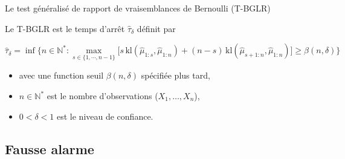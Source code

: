 \documentclass[11pt,french,ignorenonframetext,]{beamer}
\providecommand{\tightlist}{%
  \setlength{\itemsep}{0pt}\setlength{\parskip}{0pt}}
\begin{document}


\begin{frame}{Le test généralisé de rapport de vraisemblances de Bernoulli (T-BGLR)}

    Le \alert{T-BGLR} est le temps d'arrêt $\widehat{\tau}_{\delta}$ définit par
    \begin{small}
    \[ \widehat{\tau}_{\delta} = \inf \bigl\{ n \in \mathbb{N}^* : \max_{s \in \{1,\cdots,n-1\}} \bigl[s \, \mathrm{kl}\left(\widehat{\mu}_{1:s},\widehat{\mu}_{1:n}\right) + (n-s) \, \mathrm{kl}\left(\widehat{\mu}_{s+1:n},\widehat{\mu}_{1:n}\right)\bigr] \geq \beta(n,\delta) \bigr\} \]
    \vspace*{-10pt}
    \end{small}%
    \begin{itemize}\tightlist
      \item avec une \alert{function seuil} $\beta(n,\delta)$ spécifiée plus tard,
      \item $n \in \mathbb{N}^*$ est le nombre d'observations ($X_1,\dots,X_n$),
      \item $0 < \delta < 1$ est le niveau de confiance.
    \end{itemize}%

\end{frame}


\subsection{\hfill{}Fausse alarme\hfill{}}
\end{document}
